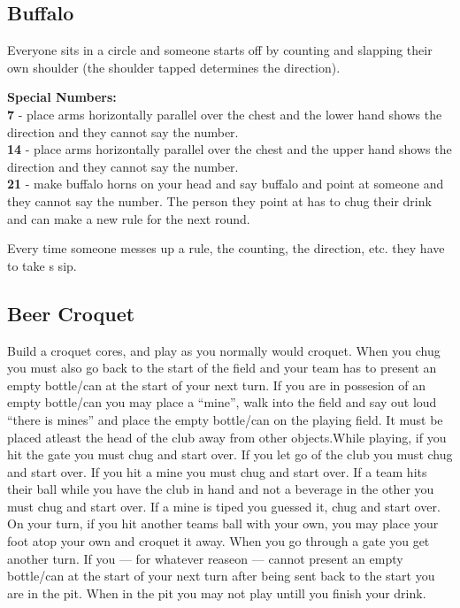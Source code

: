 \documentclass[../../../main.tex]{subfiles}
\begin{document}
\begin{multicols}{2}
\subsection*{Buffalo}
    Everyone sits in a circle and someone starts off by counting and slapping their own shoulder (the shoulder tapped determines the direction).\\\vspace{1em}

\textbf{Special Numbers:}\\
    \textbf{7} - place arms horizontally parallel over the chest and the lower hand shows the direction and they cannot say the number.\\
    \textbf{14} - place arms horizontally parallel over the chest and the upper hand shows the direction and they cannot say the number.\\
    \textbf{21} - make buffalo horns on your head and say buffalo and point at someone and they cannot say the number. The person they point at has to chug their drink and can make a new rule for the next round.\\\vspace{1em}
    
    Every time someone messes up a rule, the counting, the direction, etc. they have to take s sip.


\subsection{Beer Croquet}
    Build a croquet cores, and play as you normally would croquet. When you chug you must also go back to the start of the field and your team has to present an empty bottle/can at the start of your next turn. If you are in possesion of an empty bottle/can you may place a ``mine'', walk into the field and say out loud ``there is mines'' and place the empty bottle/can on the playing field. It must be placed atleast the head of the club away from other objects.While playing, if you hit the gate you must chug and start over. If you let go of the club you must chug and start over. If you hit a mine you must chug and start over. If a team hits their ball while you have the club in hand and not a beverage in the other you must chug and start over. If a mine is tiped you guessed it, chug and start over. On your turn, if you hit another teams ball with your own, you may place your foot atop your own and croquet it away. When you go through a gate you get another turn. If you --- for whatever reaseon --- cannot present an empty bottle/can at the start of your next turn after being sent back to the start you are in the pit. When in the pit you may not play untill you finish your drink.

\end{multicols}
\end{document}
